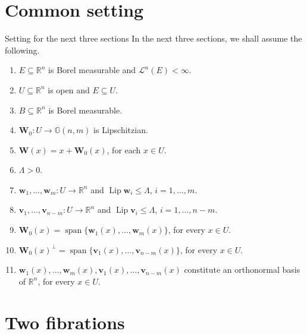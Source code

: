 \documentclass[JEP,XML,SOM,Unicode,ThmDefs,NoEqCountersInSection]{cedram}
\newenvironment{Empty}[2][\null]{%
\begin{enonce}[remark]{#1}#2}
{\end{enonce}}
\newcommand{\R}{\mathbb{R}}
\newcommand{\Rn}{\R^n}
\newcommand{\calL}{\mathscr{L}}
\newcommand{\bW}{{\boldsymbol{W}}}
\newcommand{\bv}{{\boldsymbol{v}}}
\newcommand{\bw}{{\boldsymbol{w}}}
\newcommand{\bG}{\mathbb{G}}
\DeclareMathOperator{\rmLip}{\mathrm{Lip}}
\DeclareMathOperator{\rmspan}{\mathrm{span}}
\let\subset\subseteq
\begin{document}
\section{Common setting}

\begin{Empty}[Setting for the next three sections]
\label{31}
In the next three sections, we shall assume the following.
\begin{enumerate}
\item $E \subset \Rn$ is Borel measurable and $\calL^n(E) < \infty$.
\item $U \subset \Rn$ is open and $E \subset U$.
\item $B \subset \Rn$ is Borel measurable.
\item $\bW_0: U \to \bG(n,m)$ is Lipschitzian.
\item $\bW(x) = x + \bW_0(x)$, for each $x \in U$.
\item $\Lambda > 0$.
\item $\bw_1,\ldots,\bw_m: U \to \Rn$ and $\rmLip \bw_i \leq \Lambda$, $i=1,\ldots,m$.
\item $\bv_1,\ldots,\bv_{n-m}: U \to \Rn$ and $\rmLip \bv_i \leq \Lambda$, $i=1,\ldots,n-m$.
\item $\bW_0(x) = \rmspan \{ \bw_1(x),\ldots,\bw_m(x)\}$, for every $x \in U$.
\item $\bW_0(x)^\perp = \rmspan \{ \bv_1(x),\ldots,\bv_{n-m}(x)\}$, for every $x \in U$.
\item $\bw_1(x),\ldots,\bw_m(x),\bv_1(x),\ldots,\bv_{n-m}(x)$ constitute an orthonormal basis of $\Rn$, for every $x \in U$.
\end{enumerate}
\end{Empty}

\section{Two fibrations}
\end{document}
